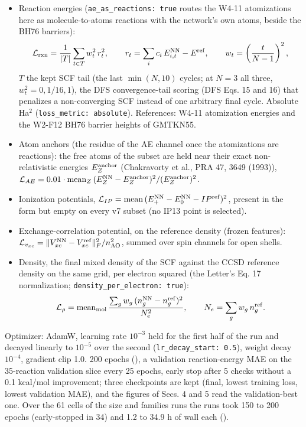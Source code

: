 \documentclass[10pt,a4paper]{article}
\begin{document}
\begin{itemize}
\item Reaction energies (\texttt{ae\_as\_reactions: true} routes the W4-11 atomizations here as molecule-to-atoms reactions with the network's own atoms, beside the BH76 barriers): \[
\mathcal{L}_{\rm rxn} = \frac{1}{|T|}\sum_{t\in T} w_t^2\, r_t^2, \qquad
r_t = \sum_i c_i\, E^{\rm NN}_{i,t} - E^{\rm ref}, \qquad
w_t = \left(\frac{t}{N-1}\right)^2,
\] $T$ the kept SCF tail (the last $\min(N, 10)$ cycles; at $N = 3$ all three, $w_t^2 = 0, 1/16, 1$), the DFS convergence-tail scoring (DFS Eqs. 15 and 16) that penalizes a non-converging SCF instead of one arbitrary final cycle. Absolute Ha$^2$ (\texttt{loss\_metric: absolute}). References: W4-11 atomization energies and the W2-F12 BH76 barrier heights of GMTKN55.
\item Atom anchors (the residue of the AE channel once the atomizations are reactions): the free atoms of the subset are held near their exact non-relativistic energies $E_Z^{\rm anchor}$ (Chakravorty et al., PRA 47, 3649 (1993)), $\mathcal{L}_{AE} = 0.01\cdot\mathrm{mean}_Z\, (E_Z^{\rm NN} - E_Z^{\rm anchor})^2 / (E_Z^{\rm anchor})^2$.
\item Ionization potentials, $\mathcal{L}_{IP} = \mathrm{mean}\,(E^{\rm NN}_{+} - E^{\rm NN}_0 - IP^{\rm ref})^2$, present in the form but empty on every v7 subset (no IP13 point is selected).
\item Exchange-correlation potential, on the reference density (frozen features): $\mathcal{L}_{v_{xc}} = \|V_{xc}^{\rm NN} - V_{xc}^{\rm ref}\|_F^2 / n_{\rm AO}^2$, summed over spin channels for open shells.
\item Density, the final mixed density of the SCF against the CCSD reference density on the same grid, per electron squared (the Letter's Eq. 17 normalization; \texttt{density\_per\_electron: true}): \[
\mathcal{L}_{\rho} = \mathrm{mean}_{\rm mol}\,\frac{\sum_g w_g\,(n^{\rm NN}_g - n^{\rm ref}_g)^2}{N_e^2},
\qquad N_e = \sum_g w_g\, n^{\rm ref}_g .
\]
\end{itemize}

Optimizer: AdamW, learning rate $10^{-3}$ held for the first half of the run and decayed linearly to $10^{-5}$ over the second (\texttt{lr\_decay\_start: 0.5}), weight decay $10^{-4}$, gradient clip 1.0. 200 epochs (), a validation reaction-energy MAE on the 35-reaction validation slice every 25 epochs, early stop after 5 checks without a 0.1 kcal/mol improvement; three checkpoints are kept (final, lowest training loss, lowest validation MAE), and the figures of Secs. 4 and 5 read the validation-best one. Over the 61 cells of the size and families runs the runs took 150 to 200 epochs (early-stopped in 34) and 1.2 to 34.9 h of wall each ().
\end{document}
